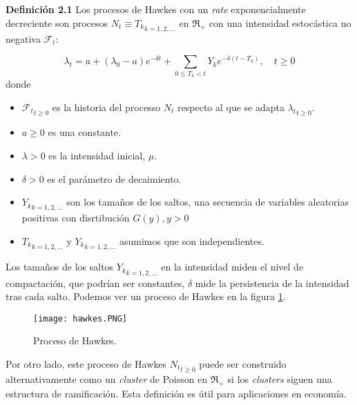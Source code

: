 \documentclass[a4paper,11pt]{book}
\begin{document}
\textbf{Definición 2.1} Los procesos de Hawkes con un \textit{rate} exponencialmente decreciente son procesos $N_t\equiv{T_k}_{k=1,2,\ldots}$ en $\Re_{+}$ 
con una intensidad estocástica no negativa $\mathcal{F}_t$:

$$\lambda_t=a+(\lambda_0-a)e^{-\delta t}+\sum_{0\leq T_k<t}Y_ke^{-\delta(t-T_k)}, \quad t\geq0$$
donde\begin{itemize}
    \item ${\mathcal{F}_t}_{t\geq0}$ es la historia del processo $N_t$ respecto al que se adapta ${\lambda_t}_{t\geq0}$.
    \item $a\geq0$ es una constante.
    \item $\lambda>0$ es la intensidad inicial, $\mu$.
    \item $\delta>0$ es el parámetro de decaimiento.
    \item ${Y_k}_{k=1,2,\ldots}$ son los tamaños de los saltos, una secuencia de variables aleatorias positivas con disrtibución $G(y), y>0$
    \item ${T_k}_{k=1,2,\ldots}$ y ${Y_k}_{k=1,2,\ldots}$ asumimos que son independientes.
\end{itemize}

Los tamaños de los saltos ${Y_k}_{k=1,2,\ldots}$ en la intensidad miden el nivel de compactación, que podrían ser constantes, $\delta$ mide la persistencia 
de la intensidad tras cada salto. Podemos ver un proceso de Hawkes en la figura \ref{f:f5}.
\begin{figure}[H]
\centering
\texttt{[image: hawkes.PNG]}
\caption{Proceso de Hawkes.}
\label{f:f5}
\end{figure}

Por otro lado, este proceso de Hawkes ${N_t}_{t\geq0}$ puede ser construido alternativamente como un \textit{cluster} de Poisson en $\Re_{+}$ si los
\textit{clusters} siguen una estructura de ramificación. Esta definición es útil para aplicaciones en economía.
\end{document}
